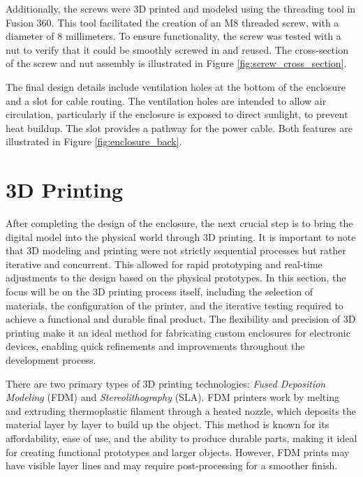 Additionally, the screws were 3D printed and modeled using the threading tool in Fusion 360. This 
tool facilitated the creation of an M8 threaded screw, with a diameter of 8 millimeters. To ensure 
functionality, the screw was tested with a nut to verify that it could be smoothly screwed in and 
reused. The cross-section of the screw and nut assembly is illustrated in Figure 
\ref{fig:screw_cross_section}.

The final design details include ventilation holes at the bottom of the enclosure and a slot for 
cable routing. The ventilation holes are intended to allow air circulation, particularly if the 
enclosure is exposed to direct sunlight, to prevent heat buildup. The slot provides a pathway for 
the power cable. Both features are illustrated in Figure \ref{fig:enclosure_back}.


%
%

\section{3D Printing}

After completing the design of the enclosure, the next crucial step is to bring the digital model 
into the physical world through 3D printing. It is important to note that 3D modeling and printing 
were not strictly sequential processes but rather iterative and concurrent. This allowed for rapid 
prototyping and real-time adjustments to the design based on the physical prototypes. In this 
section, the focus will be on the 3D printing process itself, including the selection of 
materials, the configuration of the printer, and the iterative testing required to achieve a 
functional and durable final product. The flexibility and precision of 3D printing make it an 
ideal method for fabricating custom enclosures for electronic devices, enabling quick refinements 
and improvements throughout the development process.

There are two primary types of 3D printing technologies: \textit{Fused Deposition Modeling} (FDM) 
and \textit{Stereolithography} (SLA). FDM printers work by melting and extruding thermoplastic 
filament through a heated nozzle, which deposits the material layer by layer to build up the 
object. This method is known for its affordability, ease of use, and the ability to produce 
durable parts, making it ideal for creating functional prototypes and larger objects. However, FDM 
prints may have visible layer lines and may require post-processing for a smoother finish.

